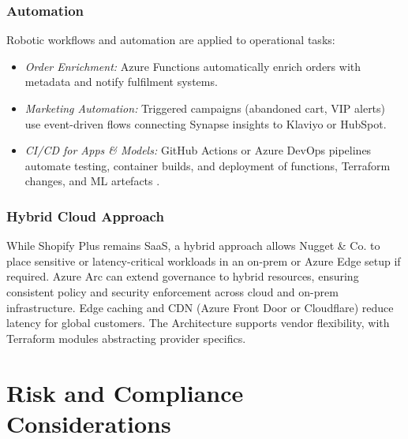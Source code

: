 \documentclass[12pt, a4paper, twoside]{article} %
\begin{document}
\subsubsection*{Automation}
Robotic workflows and automation are applied to operational tasks:
\begin{itemize}
\item \textit{Order Enrichment:} Azure Functions automatically enrich orders with metadata and notify fulfilment systems.
\item \textit{Marketing Automation:} Triggered campaigns (abandoned cart, VIP alerts) use event-driven flows connecting Synapse insights to Klaviyo or HubSpot.
\item \textit{CI/CD for Apps \& Models:} GitHub Actions or Azure DevOps pipelines automate testing, container builds, and deployment of functions, Terraform changes, and ML artefacts \citep{decan2022}.
\end{itemize}
\subsubsection*{Hybrid Cloud Approach}
While Shopify Plus remains SaaS, a hybrid approach allows Nugget \& Co. to place sensitive or latency-critical workloads in an on-prem or Azure Edge setup if required. Azure Arc can extend governance to hybrid resources, ensuring consistent policy and security enforcement across cloud and on-prem infrastructure. Edge caching and CDN (Azure Front Door or Cloudflare) reduce latency for global customers. The Architecture supports vendor flexibility, with Terraform modules abstracting provider specifics. 

\pagebreak

\section{Risk and Compliance Considerations}
\end{document}
